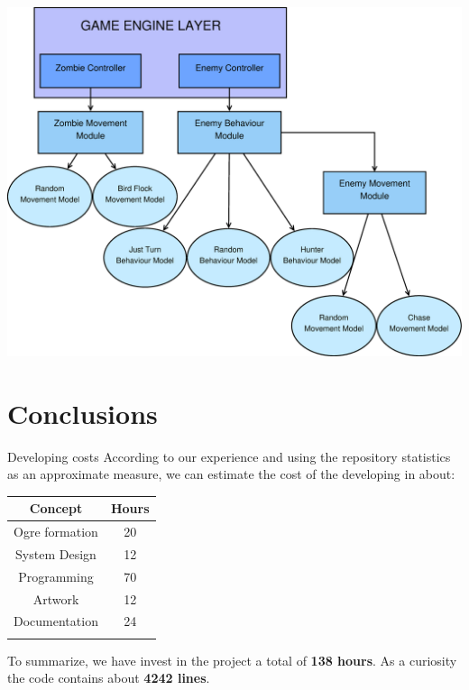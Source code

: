 \documentclass[10pt]{beamer}
\begin{document}
	    \begin{frame}[plain]
		    \includegraphics[scale=0.21]{modulos.eps}
	    \end{frame}

	\section{Conclusions}

	  \begin{frame}{Developing costs}
	    According to our experience and using the repository statistics as an approximate measure, we can estimate the cost of the developing in about: \newline

	    \begin{center}
	     \begin{tabular}{cc}

		\hline
		\textbf{Concept}	& \textbf{Hours} \\
		\hline
		Ogre formation		& 20 \\
		System Design		& 12 \\
		Programming		& 70 \\
		Artwork			& 12 \\
		Documentation		& 24 \\
		\hline
	  \newline    
	     \end{tabular}
	    \end{center}
	  
	  To summarize, we have invest in the project a total of \textbf{138 hours}. As a curiosity the code contains about \textbf{4242 lines}.
	  \end{frame}
\end{document}
